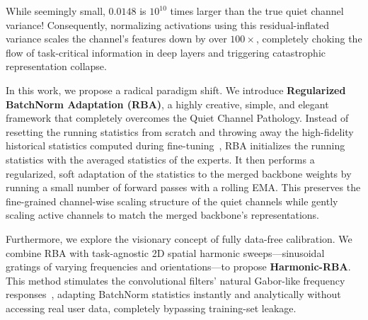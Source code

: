 \documentclass{article}
\begin{document}
While seemingly small, $0.0148$ is $10^{10}$ times larger than the true quiet channel variance! Consequently, normalizing activations using this residual-inflated variance scales the channel's features down by over $100\times$, completely choking the flow of task-critical information in deep layers and triggering catastrophic representation collapse.

In this work, we propose a radical paradigm shift. We introduce \textbf{Regularized BatchNorm Adaptation (RBA)}, a highly creative, simple, and elegant framework that completely overcomes the Quiet Channel Pathology. Instead of resetting the running statistics from scratch and throwing away the high-fidelity historical statistics computed during fine-tuning~\cite{frankle2020training, lubana2021how, santurkar2018how}, RBA initializes the running statistics with the averaged statistics of the experts. It then performs a regularized, soft adaptation of the statistics to the merged backbone weights by running a small number of forward passes with a rolling EMA. This preserves the fine-grained channel-wise scaling structure of the quiet channels while gently scaling active channels to match the merged backbone's representations.

Furthermore, we explore the visionary concept of fully data-free calibration. We combine RBA with task-agnostic 2D spatial harmonic sweeps—sinusoidal gratings of varying frequencies and orientations—to propose \textbf{Harmonic-RBA}. This method stimulates the convolutional filters' natural Gabor-like frequency responses~\cite{he2016deep, ioffe2015batch}, adapting BatchNorm statistics instantly and analytically without accessing real user data, completely bypassing training-set leakage.
\end{document}
